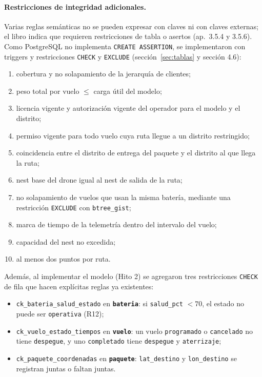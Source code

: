 \documentclass[11pt,a4paper]{article}
\newcommand{\tb}[1]{\textbf{\texttt{#1}}}
\newcommand{\at}[1]{\texttt{#1}}
\begin{document}
\paragraph{Restricciones de integridad adicionales.} Varias reglas semánticas no se pueden expresar con claves ni con claves externas; el libro indica que requieren restricciones de tabla o asertos (ap.~3.5.4 y 3.5.6). Como PostgreSQL no implementa \texttt{CREATE ASSERTION}, se implementaron con triggers y restricciones \texttt{CHECK} y \texttt{EXCLUDE} (sección~\ref{sec:tablas} y sección 4.6):
\begin{enumerate}[label=(\roman*)]
\item cobertura y no solapamiento de la jerarquía de clientes;
\item peso total por vuelo $\leq$ carga útil del modelo;
\item licencia vigente y autorización vigente del operador para el modelo y el distrito;
\item permiso vigente para todo vuelo cuya ruta llegue a un distrito restringido;
\item coincidencia entre el distrito de entrega del paquete y el distrito al que llega la ruta;
\item nest base del drone igual al nest de salida de la ruta;
\item no solapamiento de vuelos que usan la misma batería, mediante una restricción \texttt{EXCLUDE} con \texttt{btree\_gist};
\item marca de tiempo de la telemetría dentro del intervalo del vuelo;
\item capacidad del nest no excedida;
\item al menos dos puntos por ruta.
\end{enumerate}

Además, al implementar el modelo (Hito 2) se agregaron tres restricciones \texttt{CHECK} de fila que hacen explícitas reglas ya existentes:
\begin{itemize}
\item \texttt{ck\_bateria\_salud\_estado} en \tb{bateria}: si \at{salud\_pct} $< 70$, el estado no puede ser \at{operativa} (R12);
\item \texttt{ck\_vuelo\_estado\_tiempos} en \tb{vuelo}: un vuelo \at{programado} o \at{cancelado} no tiene \at{despegue}, y uno \at{completado} tiene \at{despegue} y \at{aterrizaje};
\item \texttt{ck\_paquete\_coordenadas} en \tb{paquete}: \at{lat\_destino} y \at{lon\_destino} se registran juntas o faltan juntas.
\end{itemize}
\end{document}
